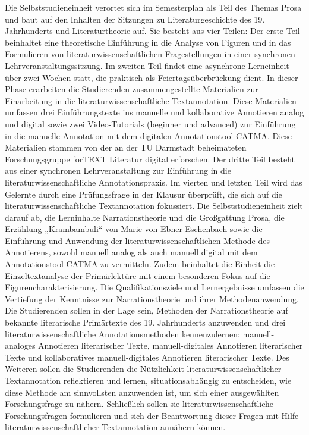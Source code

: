 \documentclass[
          a4paper,
        ]{article}
\begin{document}
Die Selbststudieneinheit verortet sich im Semesterplan als Teil des
Themas Prosa und baut auf den Inhalten der Sitzungen zu
Literaturgeschichte des 19. Jahrhunderts und Literaturtheorie auf. Sie
besteht aus vier Teilen: Der erste Teil beinhaltet eine theoretische
Einführung in die Analyse von Figuren und in das Formulieren von
literaturwissenschaftlichen Fragestellungen in einer synchronen
Lehrveranstaltungssitzung. Im zweiten Teil findet eine asynchrone
Lerneinheit über zwei Wochen statt, die praktisch als
Feiertagsüberbrückung dient. In dieser Phase erarbeiten die Studierenden
zusammengestellte Materialien zur Einarbeitung in die
literaturwissenschaftliche Textannotation. Diese Materialien umfassen
drei Einführungstexte ins manuelle und kollaborative Annotieren analog
und digital sowie zwei Video-Tutorials (beginner und advanced) zur
Einführung in die manuelle Annotation mit dem digitalen Annotationstool
CATMA. Diese Materialien stammen von der an der TU Darmstadt
beheimateten Forschungsgruppe forTEXT Literatur digital erforschen. Der
dritte Teil besteht aus einer synchronen Lehrveranstaltung zur
Einführung in die literaturwissenschaftliche Annotationspraxis. Im
vierten und letzten Teil wird das Gelernte durch eine Prüfungsfrage in
der Klausur überprüft, die sich auf die literaturwissenschaftliche
Textannotation fokussiert. Die Selbststudieneinheit zielt darauf ab, die
Lerninhalte Narrationstheorie und die Großgattung Prosa, die Erzählung
„Krambambuli`` von Marie von Ebner-Eschenbach sowie die Einführung und
Anwendung der literaturwissenschaftlichen Methode des Annotierens,
sowohl manuell analog als auch manuell digital mit dem Annotationstool
CATMA zu vermitteln. Zudem beinhaltet die Einheit die Einzeltextanalyse
der Primärlektüre mit einem besonderen Fokus auf die
Figurencharakterisierung. Die Qualifikationsziele und Lernergebnisse
umfassen die Vertiefung der Kenntnisse zur Narrationstheorie und ihrer
Methodenanwendung. Die Studierenden sollen in der Lage sein, Methoden
der Narrationstheorie auf bekannte literarische Primärtexte des 19.
Jahrhunderts anzuwenden und drei literaturwissenschaftliche
Annotationsmethoden kennenzulernen: manuell-analoges Annotieren
literarischer Texte, manuell-digitales Annotieren literarischer Texte
und kollaboratives manuell-digitales Annotieren literarischer Texte. Des
Weiteren sollen die Studierenden die Nützlichkeit
literaturwissenschaftlicher Textannotation reflektieren und lernen,
situationsabhängig zu entscheiden, wie diese Methode am sinnvollsten
anzuwenden ist, um sich einer ausgewählten Forschungsfrage zu nähern.
Schließlich sollen sie literaturwissenschaftliche Forschungsfragen
formulieren und sich der Beantwortung dieser Fragen mit Hilfe
literaturwissenschaftlicher Textannotation annähern können.
\end{document}
